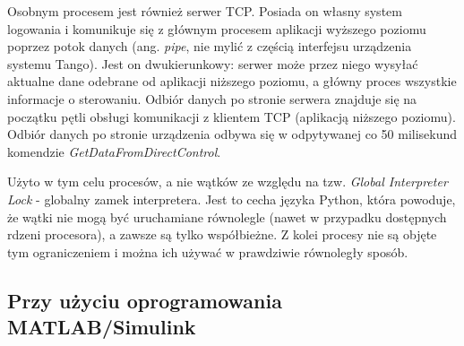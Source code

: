 Osobnym procesem jest również serwer TCP. Posiada on własny system logowania i komunikuje się z głównym procesem aplikacji wyższego poziomu poprzez potok danych (ang. \emph{pipe}, nie mylić z częścią interfejsu urządzenia systemu Tango). Jest on dwukierunkowy: serwer może przez niego wysyłać aktualne dane odebrane od aplikacji niższego poziomu, a główny proces wszystkie informacje o sterowaniu. Odbiór danych po stronie serwera znajduje się na początku pętli obsługi komunikacji z klientem TCP (aplikacją niższego poziomu). Odbiór danych po stronie urządzenia odbywa się w odpytywanej co 50 milisekund komendzie \emph{GetDataFromDirectControl}.

Użyto w tym celu procesów, a nie wątków ze względu na tzw. \emph{Global Interpreter Lock} - globalny zamek interpretera. Jest to cecha języka Python, która powoduje, że wątki nie mogą być uruchamiane równolegle (nawet w przypadku dostępnych rdzeni procesora), a zawsze są tylko współbieżne. Z kolei procesy nie są objęte tym ograniczeniem i można ich używać w prawdziwie równoległy sposób.


\subsection{Przy użyciu oprogramowania MATLAB/Simulink}
\label{sub:sym-wer-matlab}

